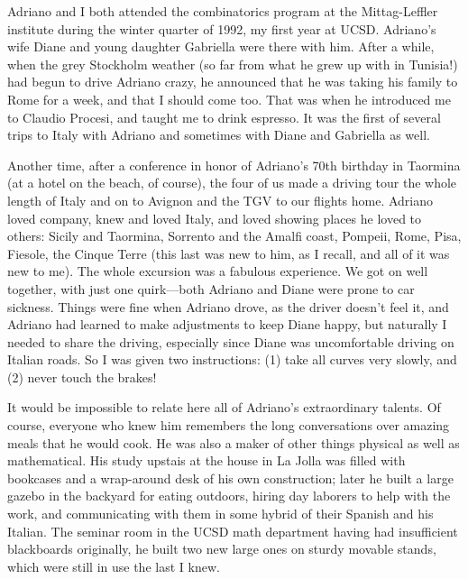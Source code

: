 \documentclass{amsart}
\begin{document}
Adriano and I both attended the combinatorics program at the Mittag-Leffler institute during the winter quarter of 1992, my first year at UCSD.   Adriano's wife Diane and young daughter Gabriella were there with him.  After a while, when the grey Stockholm weather (so far from what he grew up with in Tunisia!) had begun to drive Adriano crazy, he announced that he was taking his family to Rome for a week, and that I should come too.  That was when he introduced me to Claudio Procesi, and taught me to drink espresso.  It was the first of several trips to Italy with Adriano and sometimes with Diane and Gabriella as well.  

Another time, after a conference in honor of Adriano's 70th birthday in Taormina (at a hotel on the beach, of course), the four of us made a driving tour the whole length of Italy and on to Avignon and the TGV to our flights home.  Adriano loved company, knew and loved Italy, and loved showing places he loved to others: Sicily and Taormina, Sorrento and the Amalfi coast, Pompeii, Rome, Pisa, Fiesole, the Cinque Terre (this last was new to him, as I recall, and all of it was new to me).  The whole excursion was a fabulous experience.  We got on well together, with just one quirk---both Adriano and Diane were prone to car sickness.  Things were fine when Adriano drove, as the driver doesn't feel it, and Adriano had learned to make adjustments to keep Diane happy, but naturally I needed to share the driving, especially since Diane was uncomfortable driving on Italian roads.  So I was given two instructions: (1) take all curves very slowly, and (2) never touch the brakes!

It would be impossible to relate here all of Adriano's extraordinary talents.  Of course, everyone who knew him remembers the long conversations over amazing meals that he would cook.  He was also a maker of other things physical as well as mathematical.  His study upstais at the house in La Jolla was filled with bookcases and a wrap-around desk of his own construction; later he built a large gazebo in the backyard for eating outdoors, hiring day laborers to help with the work, and communicating with them in some hybrid of their Spanish and his Italian.  The seminar room in the UCSD math department having had insufficient blackboards originally, he built two new large ones on sturdy movable stands, which were still in use the last I knew.
\end{document}
